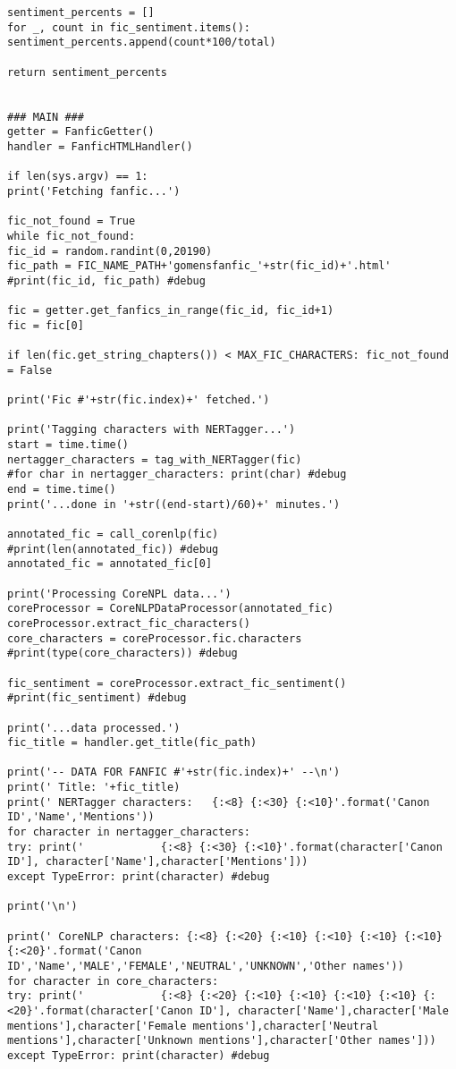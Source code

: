 \documentclass{pre-tfg}
\begin{document}
\begin{lstlisting}[style=consola]
sentiment_percents = []
for _, count in fic_sentiment.items():
sentiment_percents.append(count*100/total)

return sentiment_percents


### MAIN ###
getter = FanficGetter()
handler = FanficHTMLHandler()

if len(sys.argv) == 1:
print('Fetching fanfic...')

fic_not_found = True
while fic_not_found:
fic_id = random.randint(0,20190)
fic_path = FIC_NAME_PATH+'gomensfanfic_'+str(fic_id)+'.html'
#print(fic_id, fic_path) #debug

fic = getter.get_fanfics_in_range(fic_id, fic_id+1)
fic = fic[0]

if len(fic.get_string_chapters()) < MAX_FIC_CHARACTERS: fic_not_found = False

print('Fic #'+str(fic.index)+' fetched.')

print('Tagging characters with NERTagger...')
start = time.time()
nertagger_characters = tag_with_NERTagger(fic)
#for char in nertagger_characters: print(char) #debug
end = time.time()  
print('...done in '+str((end-start)/60)+' minutes.')

annotated_fic = call_corenlp(fic)
#print(len(annotated_fic)) #debug
annotated_fic = annotated_fic[0]

print('Processing CoreNPL data...')
coreProcessor = CoreNLPDataProcessor(annotated_fic)
coreProcessor.extract_fic_characters()
core_characters = coreProcessor.fic.characters
#print(type(core_characters)) #debug

fic_sentiment = coreProcessor.extract_fic_sentiment()
#print(fic_sentiment) #debug

print('...data processed.')
fic_title = handler.get_title(fic_path)

print('-- DATA FOR FANFIC #'+str(fic.index)+' --\n')
print(' Title: '+fic_title)
print(' NERTagger characters:	{:<8} {:<30} {:<10}'.format('Canon ID','Name','Mentions'))
for character in nertagger_characters:
try: print('			{:<8} {:<30} {:<10}'.format(character['Canon ID'], character['Name'],character['Mentions']))
except TypeError: print(character) #debug

print('\n')

print(' CoreNLP characters:	{:<8} {:<20} {:<10} {:<10} {:<10} {:<10} {:<20}'.format('Canon ID','Name','MALE','FEMALE','NEUTRAL','UNKNOWN','Other names'))
for character in core_characters:
try: print('			{:<8} {:<20} {:<10} {:<10} {:<10} {:<10} {:<20}'.format(character['Canon ID'], character['Name'],character['Male mentions'],character['Female mentions'],character['Neutral mentions'],character['Unknown mentions'],character['Other names']))
except TypeError: print(character) #debug


\end{lstlisting}
\end{document}
